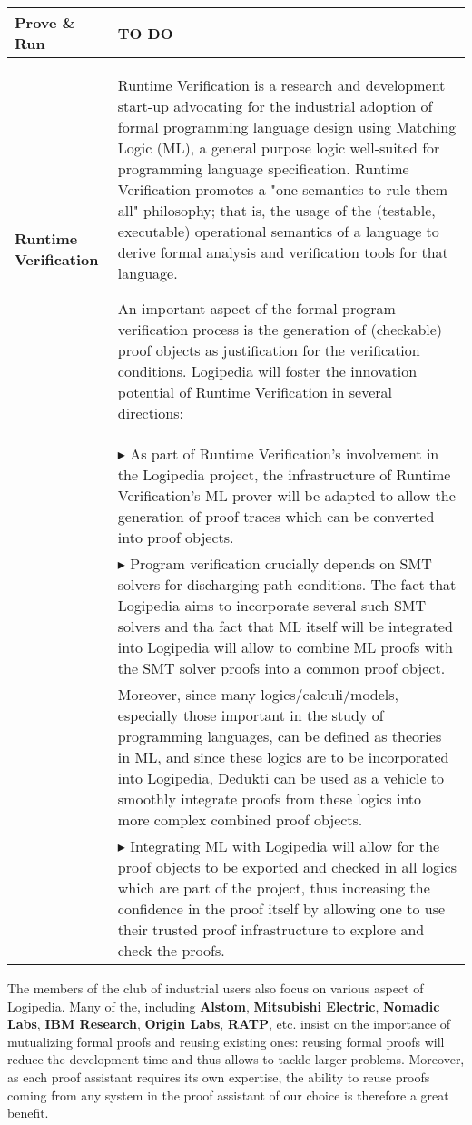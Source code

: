 \begin{longtable}{|p{}|p{}|}
\hline
{\bf Prove \& Run} & {\color{red} TO DO}\\

    
\hline

{\bf Runtime Verification} &

Runtime Verification is a research and development start-up advocating for the industrial
adoption of formal programming language design using Matching Logic (ML), a
general purpose logic well-suited for programming language specification.
Runtime Verification promotes a "one semantics to rule them all" philosophy; that is, the usage
of the (testable, executable) operational semantics of a language to derive
formal analysis and verification tools for that language.

An important aspect of the formal program verification process is the
generation of (checkable) proof objects as justification for the verification
conditions.
Logipedia will foster the innovation potential of Runtime Verification in several directions:\\
&
$\blacktriangleright$
As part of Runtime Verification's involvement in the Logipedia project, the infrastructure of 
Runtime Verification's ML prover will be adapted to allow the generation of proof traces which
can be converted into proof objects.
\\
&
$\blacktriangleright$
Program verification crucially depends on SMT solvers for discharging
path conditions. The fact that Logipedia aims to incorporate several such SMT
solvers and tha fact that ML itself will be integrated into Logipedia will
allow to combine ML proofs with the SMT solver proofs into a common proof
object.\\

&
Moreover, since many logics/calculi/models, especially those important in the
study of programming languages, can be defined as theories in ML, and since
these logics are to be incorporated into Logipedia, Dedukti can be used as a
vehicle to smoothly integrate proofs from these logics into more complex
combined proof objects.\\
&
$\blacktriangleright$
Integrating ML with Logipedia will allow for the proof objects to be exported
and checked in all logics which are part of the project, thus increasing
the confidence in the proof itself by allowing one to use their trusted proof
infrastructure to explore and check the proofs.
\\
\hline
\end{longtable}

The members of the club of industrial users also focus on
various aspect of Logipedia. Many of the, including 
{\bf Alstom}, {\bf Mitsubishi Electric}, {\bf
  Nomadic Labs}, {\bf IBM Research},  {\bf Origin Labs}, {\bf RATP},
etc.  insist on the importance of mutualizing formal proofs and
reusing existing ones: reusing formal proofs will reduce
the development time and thus allows to tackle larger
problems. Moreover, as each proof assistant requires its own
expertise, the ability to reuse proofs coming from any system in the
proof assistant of our choice is therefore a great benefit.


